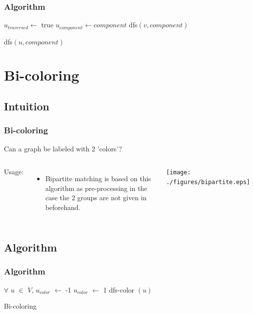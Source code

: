 \documentclass[article]{beamer}
\begin{document}
\begin{frame}
	\frametitle{Algorithm}
	
		\begin{algorithm}[H]
		\begin{algorithmic}[1]
		\STATE $u_{traversed} \gets$ true
		\STATE $u_{component} \gets component$			
		\STATE dfs$(v, component)$
		\ENDIF
		\ENDFOR
		
		\end{algorithmic}
		\caption{dfs$(u, component)$}
		\label{alg:seq}
		\end{algorithm}	
	
\end{frame}

\section{Bi-coloring}
\subsection{Intuition}
\begin{frame}
	\frametitle{Bi-coloring}
	Can a graph be labeled with 2 'colors'?
	
	\vspace{5mm}
	
	\begin{columns}
	Usage:
	\begin{itemize}
		\item Bipartite matching is based on this algorithm as pre-processing in the case the 2 groups are not given in beforehand.
	\end{itemize}
	\texttt{[image: ./figures/bipartite.eps]}
	\end{columns}
\end{frame}


\subsection{Algorithm}
\begin{frame}
	\frametitle{Algorithm}
	\begin{algorithm}[H]
		\begin{algorithmic}[1]
		\STATE $\forall$ $u$ $\in$ $V$, $u_{color}$ $\gets$ -1				
		\STATE $u_{color}$ $\gets$ 1
		\STATE dfs-color $(u)$
		\ENDIF
		\ENDFOR		
		
		\end{algorithmic}
		\caption{Bi-coloring}
		\label{alg:seq}
		\end{algorithm}
\end{frame}
\end{document}
